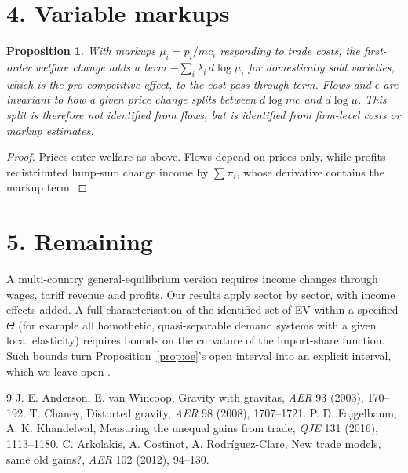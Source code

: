 \documentclass[11pt]{article}
\newtheorem{proposition}[theorem]{Proposition}
\theoremstyle{definition}
\begin{document}
\section*{4. Variable markups}
\begin{proposition}\label{prop:mk}
With markups $\mu_i=p_i/mc_i$ responding to trade costs, the first-order welfare change adds a term
$-\sum_i\lambda_i\,d\log\mu_i$ for domestically sold varieties, which is the pro-competitive effect, to the
cost-pass-through term. Flows and $\epsilon$ are invariant to how a given price change splits between $d\log mc$ and
$d\log\mu$. This split is therefore not identified from flows, but is identified from firm-level costs or markup estimates.
\end{proposition}
\begin{proof}
Prices enter welfare as above. Flows depend on prices only, while profits redistributed lump-sum change income by
$\sum\pi_i$, whose derivative contains the markup term.
\end{proof}

\section*{5. Remaining}
A multi-country general-equilibrium version requires income changes through wages, tariff revenue and profits. Our
results apply sector by sector, with income effects added. A full characterisation of the identified set of EV within a
specified $\Theta$ (for example all homothetic, quasi-separable demand systems with a given local elasticity) requires bounds
on the curvature of the import-share function. Such bounds turn Proposition~\ref{prop:oe}'s open interval into an explicit
interval, which we leave open \cite{av,chaney,fk}.

\begin{thebibliography}{9}
 J. E. Anderson, E. van Wincoop, Gravity with gravitas, \emph{AER} 93 (2003), 170--192.
 T. Chaney, Distorted gravity, \emph{AER} 98 (2008), 1707--1721.
 P. D. Fajgelbaum, A. K. Khandelwal, Measuring the unequal gains from trade, \emph{QJE} 131 (2016), 1113--1180.
 C. Arkolakis, A. Costinot, A. Rodr\'iguez-Clare, New trade models, same old gains?, \emph{AER} 102 (2012), 94--130.
\end{thebibliography}
\end{document}

